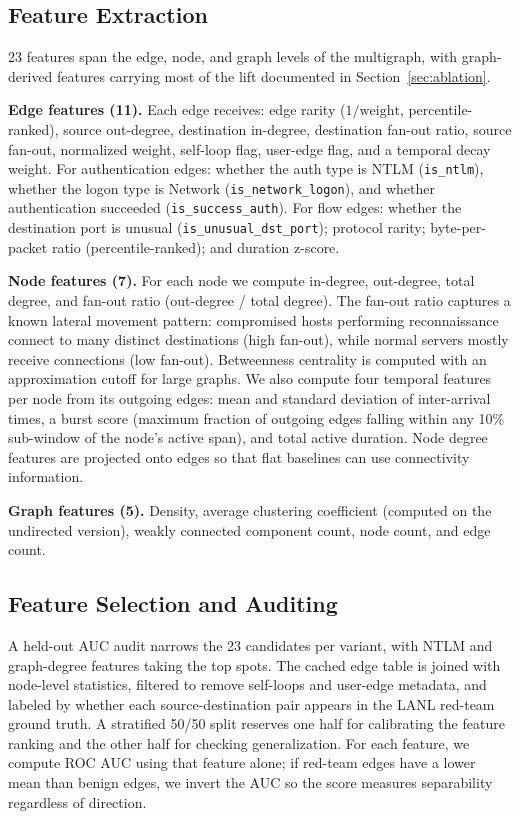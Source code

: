 \documentclass[letterpaper,twocolumn,10pt]{article}
\begin{document}
\subsection{Feature Extraction}

23 features span the edge, node, and graph levels of the multigraph, with graph-derived features carrying most of the lift documented in Section~\ref{sec:ablation}.

\textbf{Edge features (11).}
Each edge receives: edge rarity ($1 / \text{weight}$, percentile-ranked), source out-degree, destination in-degree, destination fan-out ratio, source fan-out, normalized weight, self-loop flag, user-edge flag, and a temporal decay weight. For authentication edges: whether the auth type is NTLM (\texttt{is\_ntlm}), whether the logon type is Network (\texttt{is\_network\_logon}), and whether authentication succeeded (\texttt{is\_success\_auth}). For flow edges: whether the destination port is unusual (\texttt{is\_unusual\_dst\_port}); protocol rarity; byte-per-packet ratio (percentile-ranked); and duration z-score.

\textbf{Node features (7).}
For each node we compute in-degree, out-degree, total degree, and fan-out ratio (out-degree / total degree). The fan-out ratio captures a known lateral movement pattern: compromised hosts performing reconnaissance connect to many distinct destinations (high fan-out), while normal servers mostly receive connections (low fan-out). Betweenness centrality is computed with an approximation cutoff for large graphs. We also compute four temporal features per node from its outgoing edges: mean and standard deviation of inter-arrival times, a burst score (maximum fraction of outgoing edges falling within any 10\% sub-window of the node's active span), and total active duration. Node degree features are projected onto edges so that flat baselines can use connectivity information.

\textbf{Graph features (5).}
Density, average clustering coefficient (computed on the undirected version), weakly connected component count, node count, and edge count.

\subsection{Feature Selection and Auditing}

A held-out AUC audit narrows the 23 candidates per variant, with NTLM and graph-degree features taking the top spots. The cached edge table is joined with node-level statistics, filtered to remove self-loops and user-edge metadata, and labeled by whether each source-destination pair appears in the LANL red-team ground truth. A stratified 50/50 split reserves one half for calibrating the feature ranking and the other half for checking generalization. For each feature, we compute ROC AUC using that feature alone; if red-team edges have a lower mean than benign edges, we invert the AUC so the score measures separability regardless of direction.
\end{document}
